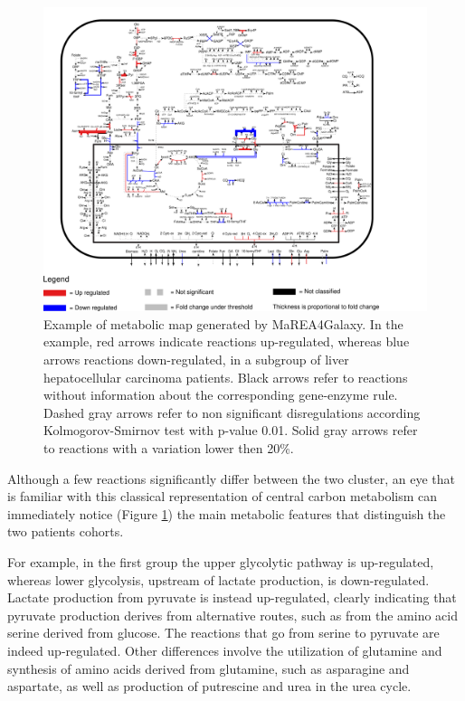 \documentclass[preprint,12pt,authoryear]{elsarticle}
\newcommand{\mareagalaxy}{\textsf{MaREA4Galaxy}}
\begin{document}
\begin{figure}[ht]
  \includegraphics[width=1\textwidth]{figs/map.pdf}
  \caption{Example of metabolic map generated by \mareagalaxy. In the
    example, red arrows indicate reactions up-regulated, whereas blue
    arrows reactions down-regulated, in a subgroup of liver
    hepatocellular carcinoma patients. Black arrows refer to reactions
    without information about the corresponding gene-enzyme
    rule. Dashed gray arrows refer to non significant disregulations
    according Kolmogorov-Smirnov test with p-value 0.01. Solid gray
    arrows refer to reactions with a variation lower then 20\%.}
  \label{fig:map}
\end{figure}

Although a few reactions significantly differ between the two cluster,
an eye that is familiar with this classical representation of central
carbon metabolism can immediately notice (Figure \ref{fig:map}) the
main metabolic features that distinguish the two patients cohorts.

For example, in the first group the upper glycolytic pathway is
up-regulated, whereas lower glycolysis, upstream of lactate
production, is down-regulated. Lactate production from pyruvate is
instead up-regulated, clearly indicating that pyruvate production
derives from alternative routes, such as from the amino acid serine
derived from glucose. The reactions that go from serine to pyruvate
are indeed up-regulated. Other differences involve the utilization of
glutamine and synthesis of amino acids derived from glutamine, such as
asparagine and aspartate, as well as production of putrescine and urea
in the urea cycle.
\end{document}
